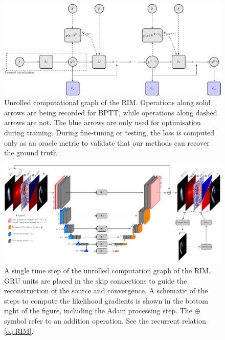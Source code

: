 \documentclass[twocolumn]{aastex631}
\begin{document}
\begin{figure}[ht!]
        \centering
        \includegraphics[width=\linewidth]{figures/schematic_rim_unrolled}
        \caption{Unrolled computational graph of the RIM. Operations along solid arrows are being 
        recorded for BPTT, while operations along dashed arrows are not. The blue arrows are only 
        used for optimisation during training. During fine-tuning or testing, the loss is computed only 
        as an oracle metric to validate that our methods can recover the ground truth.}
        \label{fig:unrolled_graph}
\end{figure}

\begin{figure}[ht!]
        \centering
        \includegraphics[width=\textwidth]{figures/unet_architecture.pdf}
        \caption{
A single time step of the unrolled computation graph of the RIM.
GRU units are placed in the skip connections to guide the 
reconstruction of the source and convergence. A schematic of the steps to compute 
the likelihood gradients is shown in the bottom right of the figure, including the 
Adam processing step. The $\oplus$ symbol refer to an addition operation. See
the recurrent relation \ref{eq:RIM}.
}
        \label{fig:unet}
\end{figure}
\end{document}
